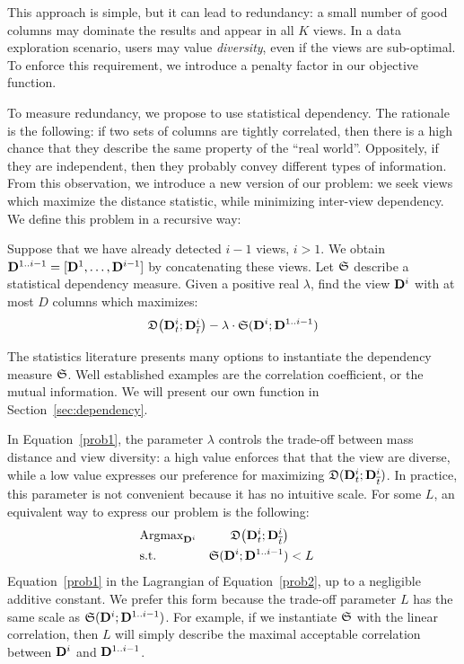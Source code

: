 This approach is simple, but it can lead to redundancy: a small number
of good columns may dominate the results and appear in all $K$ views. In a data
exploration scenario, users may value \emph{diversity}, even if the views are
sub-optimal. To enforce this requirement, we introduce a penalty factor in our
objective function. 

To measure redundancy, we propose to use statistical dependency. The rationale
is the following: if two sets of columns are tightly correlated, then there is
a high chance that they describe the same property of the ``real world''.
Oppositely, if they are independent, then they probably convey different types
of information. From this observation, we introduce a new version of our
problem: we seek views which maximize the distance statistic, while minimizing
inter-view dependency.  We define this problem in a recursive way:
\begin{problem}
    Suppose that we have already detected $i-1$ views, $i > 1$. We obtain
    $\mathbf{D}^{1..i-1} =
    [\mathbf{D}^1, \ldots, \mathbf{D}^{i-1}]$ by concatenating these views. Let
    $\mathfrak{S}$ describe a statistical dependency measure. Given a
    positive real $\lambda$, find the view $\mathbf{D}^{i}$ with at most $D$
    columns which maximizes:
        \begin{equation}
            \label{prob1}
            \mathfrak{D}\big( \mathbf{D}^{i}_t  ; \mathbf{D}^{i}_{\overline{t}} \big) - 
            \lambda \cdot \mathfrak{S} ( \mathbf{D}^{i} ; \mathbf{D}^{1..i-1})
        \end{equation}
\end{problem}
The statistics literature presents many options to instantiate the dependency
measure $\mathfrak{S}$. Well established examples are the correlation coefficient, or
the mutual information. We will present our own function in
Section~\ref{sec:dependency}.

In Equation~\ref{prob1}, the parameter $\lambda$ controls the trade-off between
mass distance and view diversity: a high value enforces that that the view are
diverse, while a low value expresses our preference for maximizing $\mathfrak{D}(
\mathbf{D}^{i}_t  ; \mathbf{D}^{i}_{\overline{t}})$. In practice, this parameter is
not convenient because it has no intuitive scale. For some $L$, an
equivalent way to express our problem is the following:
\begin{equation}
    \label{prob2}
    \begin{aligned}
        & \text{Argmax}_{\mathbf{D}^{i}} 
            & \mathfrak{D}\big( \mathbf{D}^{i}_t  ; \mathbf{D}^{i}_{\overline{t}} \big)\\
        & \text{s.t.} 
        &\mathfrak{S} ( \mathbf{D}^{i} ; \mathbf{D}^{1..i-1}) & < L\\ 
    \end{aligned}
\end{equation}
Equation~\ref{prob1} in the Lagrangian of Equation~\ref{prob2}, up to a
negligible additive constant. We prefer this form because the trade-off
parameter $L$ has the same scale as $\mathfrak{S} ( \mathbf{D}^{i} ; \mathbf{D}^{1..i-1}) $.
For example, if we instantiate $\mathfrak{S}$ with the linear correlation, then $L$
will simply describe the maximal acceptable correlation between $\mathbf{D}^{i}$
and $\mathbf{D}^{1..i-1}$.

